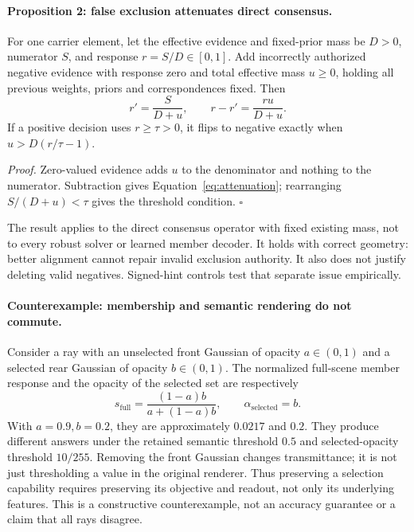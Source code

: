 \paragraph{Proposition 2: false exclusion attenuates direct consensus.}
For one carrier element, let the effective evidence and fixed-prior mass be
$D>0$, numerator $S$, and response $r=S/D\in[0,1]$. Add incorrectly authorized
negative evidence with response zero and total effective mass $u\geq0$,
holding all previous weights, priors and correspondences fixed. Then
\begin{equation}
 r'=\frac{S}{D+u},\qquad r-r'=\frac{ru}{D+u}.
 \label{eq:attenuation}
\end{equation}
If a positive decision uses $r\geq\tau>0$, it flips to negative exactly when
$u>D(r/\tau-1)$.

\emph{Proof.} Zero-valued evidence adds $u$ to the denominator and nothing to
the numerator. Subtraction gives Equation~\ref{eq:attenuation}; rearranging
$S/(D+u)<\tau$ gives the threshold condition. $\square$

The result applies to the direct consensus operator with fixed existing mass,
not to every robust solver or learned member decoder. It holds with correct
geometry: better alignment cannot repair invalid exclusion authority. It also
does not justify deleting valid negatives. Signed-hint controls test that
separate issue empirically.

\paragraph{Counterexample: membership and semantic rendering do not commute.}
Consider a ray with an unselected front Gaussian of opacity $a\in(0,1)$ and
a selected rear Gaussian of opacity $b\in(0,1)$. The normalized full-scene
member response and the opacity of the selected set are respectively
\begin{equation}
 s_{\mathrm{full}}=\frac{(1-a)b}{a+(1-a)b},\qquad
 \alpha_{\mathrm{selected}}=b.
 \label{eq:readout-counterexample}
\end{equation}
With $a=0.9,b=0.2$, they are approximately $0.0217$ and $0.2$.
They produce different answers under the retained semantic threshold $0.5$
and selected-opacity threshold $10/255$. Removing the front Gaussian changes
transmittance; it is not just thresholding a value in the original renderer.
Thus preserving a selection capability requires preserving its objective and
readout, not only its underlying features. This is a constructive counterexample,
not an accuracy guarantee or a claim that all rays disagree.

